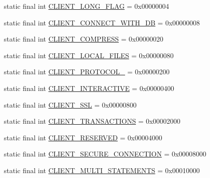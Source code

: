 \begin{DoxyCompactItemize}
\item 
static final int \mbox{\hyperlink{classcom_1_1mysql_1_1cj_1_1protocol_1_1a_1_1_native_server_session_a703dd61c0350eaf916079bdebd1de0f5}{C\+L\+I\+E\+N\+T\+\_\+\+L\+O\+N\+G\+\_\+\+F\+L\+AG}} = 0x00000004
\item 
static final int \mbox{\hyperlink{classcom_1_1mysql_1_1cj_1_1protocol_1_1a_1_1_native_server_session_a94799cd3c2d19d0688ea1189aee1e788}{C\+L\+I\+E\+N\+T\+\_\+\+C\+O\+N\+N\+E\+C\+T\+\_\+\+W\+I\+T\+H\+\_\+\+DB}} = 0x00000008
\item 
static final int \mbox{\hyperlink{classcom_1_1mysql_1_1cj_1_1protocol_1_1a_1_1_native_server_session_a3571df6d003f0b5041708ba5a5f0b0ea}{C\+L\+I\+E\+N\+T\+\_\+\+C\+O\+M\+P\+R\+E\+SS}} = 0x00000020
\item 
static final int \mbox{\hyperlink{classcom_1_1mysql_1_1cj_1_1protocol_1_1a_1_1_native_server_session_a30849aeb0efe6b6b175aafda4be95c37}{C\+L\+I\+E\+N\+T\+\_\+\+L\+O\+C\+A\+L\+\_\+\+F\+I\+L\+ES}} = 0x00000080
\item 
static final int \mbox{\hyperlink{classcom_1_1mysql_1_1cj_1_1protocol_1_1a_1_1_native_server_session_ac6f7af0e348dfe33281f8bfc8ecdc906}{C\+L\+I\+E\+N\+T\+\_\+\+P\+R\+O\+T\+O\+C\+O\+L\+\_}} = 0x00000200
\item 
static final int \mbox{\hyperlink{classcom_1_1mysql_1_1cj_1_1protocol_1_1a_1_1_native_server_session_ac301c144f07b3d53d0b25a5c5480fed8}{C\+L\+I\+E\+N\+T\+\_\+\+I\+N\+T\+E\+R\+A\+C\+T\+I\+VE}} = 0x00000400
\item 
static final int \mbox{\hyperlink{classcom_1_1mysql_1_1cj_1_1protocol_1_1a_1_1_native_server_session_ab710f1c8c0eb6890bc5b77fd3f384a77}{C\+L\+I\+E\+N\+T\+\_\+\+S\+SL}} = 0x00000800
\item 
static final int \mbox{\hyperlink{classcom_1_1mysql_1_1cj_1_1protocol_1_1a_1_1_native_server_session_a3040ed4859c291123a53cfd7538c4376}{C\+L\+I\+E\+N\+T\+\_\+\+T\+R\+A\+N\+S\+A\+C\+T\+I\+O\+NS}} = 0x00002000
\item 
static final int \mbox{\hyperlink{classcom_1_1mysql_1_1cj_1_1protocol_1_1a_1_1_native_server_session_a921f2f1746a31fbe494f1ac264da0e83}{C\+L\+I\+E\+N\+T\+\_\+\+R\+E\+S\+E\+R\+V\+ED}} = 0x00004000
\item 
static final int \mbox{\hyperlink{classcom_1_1mysql_1_1cj_1_1protocol_1_1a_1_1_native_server_session_a7d8e14fcd08c510b951ee715b870c571}{C\+L\+I\+E\+N\+T\+\_\+\+S\+E\+C\+U\+R\+E\+\_\+\+C\+O\+N\+N\+E\+C\+T\+I\+ON}} = 0x00008000
\item 
static final int \mbox{\hyperlink{classcom_1_1mysql_1_1cj_1_1protocol_1_1a_1_1_native_server_session_ac5e827f5fd45e70902a3d83827007cf3}{C\+L\+I\+E\+N\+T\+\_\+\+M\+U\+L\+T\+I\+\_\+\+S\+T\+A\+T\+E\+M\+E\+N\+TS}} = 0x00010000

\end{DoxyCompactItemize}
